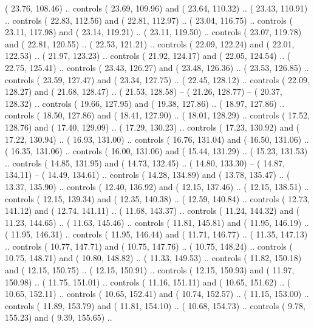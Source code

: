 {        (  23.76, 108.46) .. controls (  23.69, 109.96) and (  23.64, 110.32) ..
        (  23.43, 110.91) .. controls (  22.83, 112.56) and (  22.81, 112.97) ..
        (  23.04, 116.75) .. controls (  23.11, 117.98) and (  23.14, 119.21) ..
        (  23.11, 119.50) .. controls (  23.07, 119.78) and (  22.81, 120.55) ..
        (  22.53, 121.21) .. controls (  22.09, 122.24) and (  22.01, 122.53) ..
        (  21.97, 123.23) .. controls (  21.92, 124.17) and (  22.05, 124.54) ..
        (  22.75, 125.41) .. controls (  23.43, 126.27) and (  23.48, 126.36) ..
        (  23.53, 126.85) .. controls (  23.59, 127.47) and (  23.34, 127.75) ..
        (  22.45, 128.12) .. controls (  22.09, 128.27) and (  21.68, 128.47) ..
        (  21.53, 128.58) -- 
        (  21.26, 128.77) -- 
        (  20.37, 128.32) .. controls (  19.66, 127.95) and (  19.38, 127.86) ..
        (  18.97, 127.86) .. controls (  18.50, 127.86) and (  18.41, 127.90) ..
        (  18.01, 128.29) .. controls (  17.52, 128.76) and (  17.40, 129.09) ..
        (  17.29, 130.23) .. controls (  17.23, 130.92) and (  17.22, 130.94) ..
        (  16.93, 131.00) .. controls (  16.76, 131.04) and (  16.50, 131.06) ..
        (  16.35, 131.06) .. controls (  16.00, 131.06) and (  15.44, 131.29) ..
        (  15.23, 131.53) .. controls (  14.85, 131.95) and (  14.73, 132.45) ..
        (  14.80, 133.30) -- 
        (  14.87, 134.11) -- 
        (  14.49, 134.61) .. controls (  14.28, 134.89) and (  13.78, 135.47) ..
        (  13.37, 135.90) .. controls (  12.40, 136.92) and (  12.15, 137.46) ..
        (  12.15, 138.51) .. controls (  12.15, 139.34) and (  12.35, 140.38) ..
        (  12.59, 140.84) .. controls (  12.73, 141.12) and (  12.74, 141.11) ..
        (  11.68, 143.37) .. controls (  11.24, 144.32) and (  11.23, 144.65) ..
        (  11.63, 145.46) .. controls (  11.81, 145.81) and (  11.95, 146.19) ..
        (  11.95, 146.31) .. controls (  11.95, 146.44) and (  11.71, 146.77) ..
        (  11.35, 147.13) .. controls (  10.77, 147.71) and (  10.75, 147.76) ..
        (  10.75, 148.24) .. controls (  10.75, 148.71) and (  10.80, 148.82) ..
        (  11.33, 149.53) .. controls (  11.82, 150.18) and (  12.15, 150.75) ..
        (  12.15, 150.91) .. controls (  12.15, 150.93) and (  11.97, 150.98) ..
        (  11.75, 151.01) .. controls (  11.16, 151.11) and (  10.65, 151.62) ..
        (  10.65, 152.11) .. controls (  10.65, 152.41) and (  10.74, 152.57) ..
        (  11.15, 153.00) .. controls (  11.89, 153.79) and (  11.81, 154.10) ..
        (  10.68, 154.73) .. controls (   9.78, 155.23) and (   9.39, 155.65) ..
}
